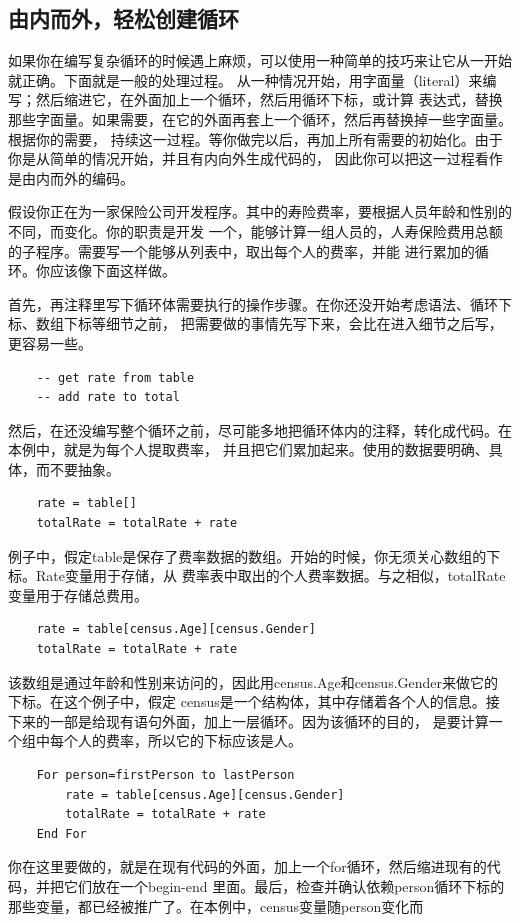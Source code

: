 \documentclass{article}
\begin{document}
\subsection{由内而外，轻松创建循环}
如果你在编写复杂循环的时候遇上麻烦，可以使用一种简单的技巧来让它从一开始就正确。下面就是一般的处理过程。
从一种情况开始，用字面量（literal）来编写；然后缩进它，在外面加上一个循环，然后用循环下标，或计算
表达式，替换那些字面量。如果需要，在它的外面再套上一个循环，然后再替换掉一些字面量。根据你的需要，
持续这一过程。等你做完以后，再加上所有需要的初始化。由于你是从简单的情况开始，并且有内向外生成代码的，
因此你可以把这一过程看作是由内而外的编码。
\par
假设你正在为一家保险公司开发程序。其中的寿险费率，要根据人员年龄和性别的不同，而变化。你的职责是开发
一个，能够计算一组人员的，人寿保险费用总额的子程序。需要写一个能够从列表中，取出每个人的费率，并能
进行累加的循环。你应该像下面这样做。
\par
首先，再注释里写下循环体需要执行的操作步骤。在你还没开始考虑语法、循环下标、数组下标等细节之前，
把需要做的事情先写下来，会比在进入细节之后写，更容易一些。
\begin{lstlisting}
    -- get rate from table
    -- add rate to total
\end{lstlisting}
然后，在还没编写整个循环之前，尽可能多地把循环体内的注释，转化成代码。在本例中，就是为每个人提取费率，
并且把它们累加起来。使用的数据要明确、具体，而不要抽象。
\begin{lstlisting}
    rate = table[]
    totalRate = totalRate + rate
\end{lstlisting}
例子中，假定table是保存了费率数据的数组。开始的时候，你无须关心数组的下标。Rate变量用于存储，从
费率表中取出的个人费率数据。与之相似，totalRate变量用于存储总费用。
\begin{lstlisting}
    rate = table[census.Age][census.Gender]
    totalRate = totalRate + rate
\end{lstlisting}
该数组是通过年龄和性别来访问的，因此用census.Age和census.Gender来做它的下标。在这个例子中，假定
census是一个结构体，其中存储着各个人的信息。接下来的一部是给现有语句外面，加上一层循环。因为该循环的目的，
是要计算一个组中每个人的费率，所以它的下标应该是人。
\begin{lstlisting}
    For person=firstPerson to lastPerson
        rate = table[census.Age][census.Gender]
        totalRate = totalRate + rate
    End For
\end{lstlisting}
你在这里要做的，就是在现有代码的外面，加上一个for循环，然后缩进现有的代码，并把它们放在一个begin-end
里面。最后，检查并确认依赖person循环下标的那些变量，都已经被推广了。在本例中，census变量随person变化而
\end{document}
